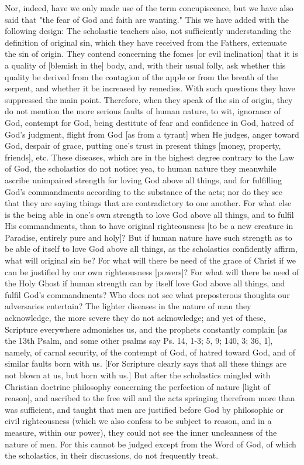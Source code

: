 Nor, indeed, have we only made use of the term concupiscence, but we
have also said that "the fear of God and faith are wanting." This we
have added with the following design: The scholastic teachers also,
not sufficiently understanding the definition of original sin, which
they have received from the Fathers, extenuate the sin of origin.
They contend concerning the fomes [or evil inclination] that it is a
quality of [blemish in the] body, and, with their usual folly, ask
whether this quality be derived from the contagion of the apple or
from the breath of the serpent, and whether it be increased by
remedies.  With such questions they have suppressed the main point.
Therefore, when they speak of the sin of origin, they do not mention
the more serious faults of human nature, to wit, ignorance of God,
contempt for God, being destitute of fear and confidence in God,
hatred of God's judgment, flight from God [as from a tyrant] when He
judges, anger toward God, despair of grace, putting one's trust in
present things [money, property, friends], etc. These diseases, which
are in the highest degree contrary to the Law of God, the scholastics
do not notice; yea, to human nature they meanwhile ascribe unimpaired
strength for loving God above all things, and for fulfilling God's
commandments according to the substance of the acts; nor do they see
that they are saying things that are contradictory to one another.
For what else is the being able in one's own strength to love God
above all things, and to fulfil His commandments, than to have
original righteousness [to be a new creature in Paradise, entirely
pure and holy]?  But if human nature have such strength as to be able
of itself to love God above all things, as the scholastics
confidently affirm, what will original sin be?  For what will there
be need of the grace of Christ if we can be justified by our own
righteousness [powers]?  For what will there be need of the Holy
Ghost if human strength can by itself love God above all things, and
fulfil God's commandments?  Who does not see what preposterous
thoughts our adversaries entertain?  The lighter diseases in the
nature of man they acknowledge, the more severe they do not
acknowledge; and yet of these, Scripture everywhere admonishes us,
and the prophets constantly complain [as the 13th Psalm, and some
other psalms say Ps. 14, 1-3; 5, 9; 140, 3; 36, 1], namely, of carnal
security, of the contempt of God, of hatred toward God, and of
similar faults born with us.  [For Scripture clearly says that all
these things are not blown at us, but born with us.] But after the
scholastics mingled with Christian doctrine philosophy concerning the
perfection of nature [light of reason], and ascribed to the free will
and the acts springing therefrom more than was sufficient, and taught
that men are justified before God by philosophic or civil
righteousness (which we also confess to be subject to reason, and in
a measure, within our power), they could not see the inner
uncleanness of the nature of men.  For this cannot be judged except
from the Word of God, of which the scholastics, in their discussions,
do not frequently treat.

